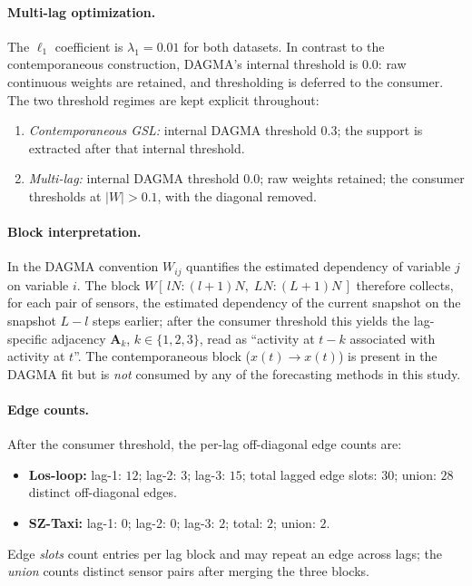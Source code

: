 \paragraph{Multi-lag optimization.}
The $\ell_1$ coefficient is $\lambda_1=0.01$ for both datasets. In contrast to
the contemporaneous construction, DAGMA's internal threshold is $0.0$: raw
continuous weights are retained, and thresholding is deferred to the consumer.
The two threshold regimes are kept explicit throughout:
\begin{enumerate}
\item \emph{Contemporaneous GSL:} internal DAGMA threshold $0.3$; the support
is extracted after that internal threshold.
\item \emph{Multi-lag:} internal DAGMA threshold $0.0$; raw weights retained;
the consumer thresholds at $|W|>0.1$, with the diagonal removed.
\end{enumerate}

\paragraph{Block interpretation.}
In the DAGMA convention $W_{ij}$ quantifies the estimated dependency of
variable $j$ on variable $i$. The block
$W[\,lN:(l{+}1)N,\;LN:(L{+}1)N\,]$ therefore collects, for each pair of
sensors, the estimated dependency of the current snapshot on the snapshot
$L-l$ steps earlier; after the consumer threshold this yields the lag-specific
adjacency $\mathbf{A}_k$, $k\in\{1,2,3\}$, read as ``activity at $t-k$
associated with activity at $t$''. The contemporaneous block
($x(t)\rightarrow x(t)$) is present in the DAGMA fit but is \emph{not}
consumed by any of the forecasting methods in this study.

\paragraph{Edge counts.}
After the consumer threshold, the per-lag off-diagonal edge counts are:

\begin{itemize}
\item \textbf{Los-loop:} lag-1: $12$; lag-2: $3$; lag-3: $15$; total lagged
edge slots: $30$; union: $28$ distinct off-diagonal edges.
\item \textbf{SZ-Taxi:} lag-1: $0$; lag-2: $0$; lag-3: $2$; total: $2$; union: $2$.
\end{itemize}
Edge \emph{slots} count entries per lag block and may repeat an edge across
lags; the \emph{union} counts distinct sensor pairs after merging the three
blocks.

